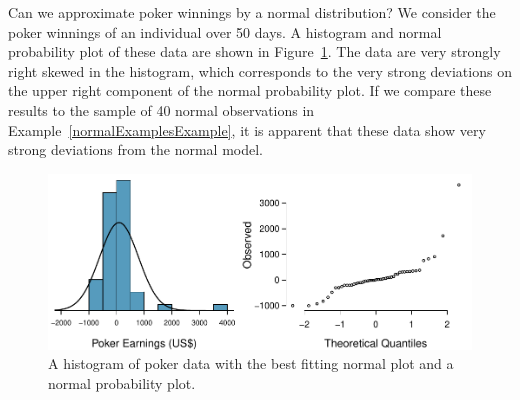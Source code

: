 \begin{examplewrap}
\begin{nexample}{Can we approximate poker winnings by a normal distribution? We consider the poker winnings of an individual over 50 days. A histogram and normal probability plot of these data are shown in Figure~\ref{pokerNormal}.}
The data are very strongly right skewed in the histogram, which corresponds to the very strong deviations on the upper right component of the normal probability plot. If we compare these results to the sample of 40 normal observations in Example~\ref{normalExamplesExample}, it is apparent that these data show very strong deviations from the normal model.
\end{nexample}
\end{examplewrap}

\begin{figure}
\centering
\includegraphics[width=\textwidth]{ch_distributions/figures/pokerNormal/pokerNormal}
\caption{A histogram of poker data with the best fitting normal plot and a normal probability plot.}
\label{pokerNormal}
\end{figure}

